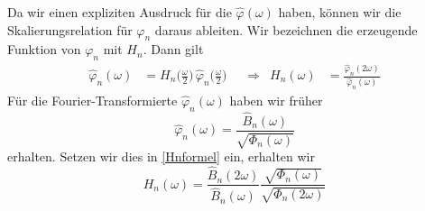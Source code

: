 Da wir einen expliziten Ausdruck für die $\hat{\varphi}(\omega)$ haben,
können wir die Skalierungsrelation für $\varphi_n$ daraus ableiten.
Wir bezeichnen die erzeugende Funktion von $\varphi_n$ mit $H_n$.
Dann gilt
\begin{equation}
\begin{aligned}
\hat{\varphi}_n(\omega)
&=
H_n\biggl(\frac{\omega}2\biggr)
\,
\hat{\varphi}_n\biggl(\frac{\omega}2\biggr)
&&\Rightarrow&
H_n(\omega)
&=
\frac{\hat{\varphi}_n(2\omega)}{\hat{\varphi}_n(\omega)}
\end{aligned}
\label{Hnformel}
\end{equation}
Für die Fourier-Transformierte $\hat{\varphi}_n(\omega)$ haben wir früher
\[
\hat{\varphi}_n(\omega)
=
\frac{\hat{B}_n(\omega)}{\sqrt{\Phi_n(\omega)}}
\]
erhalten.
Setzen wir dies in \eqref{Hnformel} ein, erhalten wir
\begin{equation}
H_n(\omega)
=
\frac{\hat{B}_n(2\omega)}{\hat{B}_n(\omega)}
\frac{\sqrt{\Phi_n(\omega)}}{\sqrt{\Phi_n(2\omega)}}
\label{formel:phinskal}
\end{equation}

